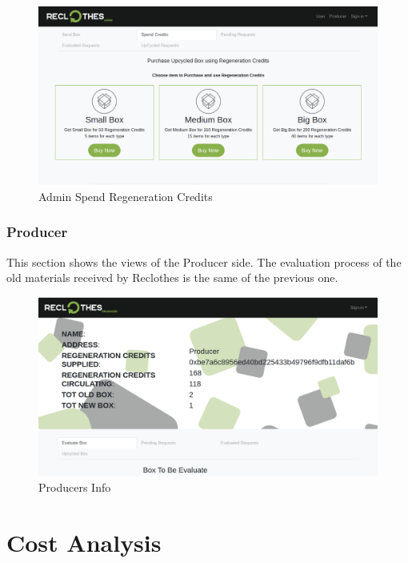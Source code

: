 \begin{figure}[h!]
    \centering
    \includegraphics[totalheight=7.5cm]{img/dapp/adminp-buy.png}
    \caption{Admin Spend Regeneration Credits}
    \label{fig:adminp-buy}
\end{figure}

\newpage
\subsubsection{Producer}

This section shows the views of the Producer side. The evaluation process of the old materials
received by Reclothes is the same of the previous one.

\begin{figure}[h!]
    \centering
    \includegraphics[totalheight=7.5cm]{img/dapp/producer-info.png}
    \caption{Producers Info}
    \label{fig:producer-info}
\end{figure}


\section{Cost Analysis}

